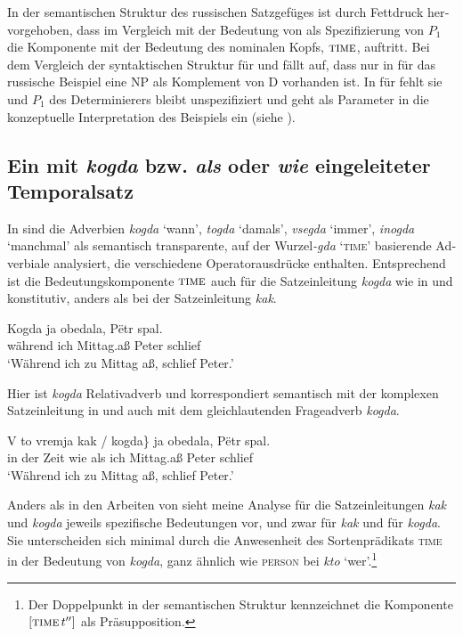 \documentclass[output=paper, colorlinks, citecolor=brown, booklanguage=german]{langscibook}
\begin{document}
\begin{otherlanguage}{german}
\noindent In der semantischen Struktur  des russischen Satzgefüges  ist durch Fettdruck hervorgehoben, dass im Vergleich mit der Bedeutung von  als Spe\-zi\-fi\-zie\-rung von $P_1$ die Komponente mit der Bedeutung des nominalen Kopfs, $\textsc{time}$, auftritt. Bei dem Vergleich der syntaktischen Struktur für  und  fällt auf, dass nur in  für das russische Beispiel  eine NP als Komplement von D vorhanden ist. In  für  fehlt sie und $P_1$ des Determinierers bleibt unspezifiziert und geht als Parameter in die konzeptuelle Interpretation des Beispiels ein (siehe ).

\subsection{Ein mit \textit{kogda} bzw. \textit{als} oder \textit{wie} eingeleiteter Temporalsatz} \label{subsec:18:3.4}

\noindent In \citet{zi18:Zimmermann2000} sind die Adverbien \textit{kogda} `wann', \textit{togda} `damals', \textit{vsegda} `immer', \textit{inogda} `manchmal' als semantisch transparente, auf der Wurzel\linebreak \textit{-gda} `\textsc{time}' basierende Adverbiale analysiert, die verschiedene Ope\-ra\-tor\-aus\-drücke enthalten. Entsprechend ist die Bedeutungskomponente $\textsc{time}$ auch für die Satz\-ein\-lei\-tung \textit{kogda} wie in  und  konstitutiv, anders als bei der Satzeinleitung  \textit{kak}.

\ea \label{ex:18:36}
    \gll Kogda ja obedala, Pëtr spal.\\
    während ich Mittag.aß Peter schlief\\
    \glt ‘Während ich zu Mittag aß, schlief Peter.’
\z

\noindent Hier ist \textit{kogda} Relativadverb und korrespondiert semantisch mit der komplexen Satzeinleitung in  und auch mit dem gleichlautenden Frageadverb \textit{kogda}.

\ea \label{ex:18:37}
    \gll V to vremja \minsp{\{} kak / kogda\} ja obedala, Pëtr spal.\\
    in der Zeit {} wie {} als ich Mittag.aß Peter schlief\\
    \glt ‘Während ich zu Mittag aß, schlief Peter.’
\z

\noindent Anders als in den Arbeiten von \citeauthor{Gronn-Stechow2010} 
sieht meine Analyse für die Satzeinleitungen \textit{kak} und \textit{kogda} jeweils spezifische Bedeutungen vor, und zwar  für \textit{kak} und  für \textit{kogda}. Sie unterscheiden sich minimal durch die Anwesenheit des Sortenprädikats \textsc{time} in der Bedeutung von \textit{kogda}, ganz ähnlich wie \textsc{person} bei \textit{kto} `wer'.\footnote{\label{fn:18:9}Der Doppelpunkt in der semantischen Struktur  kennzeichnet die Komponente $[\textsc{time}\, t'']$ als Präsupposition.}


\end{otherlanguage}
\end{document}
